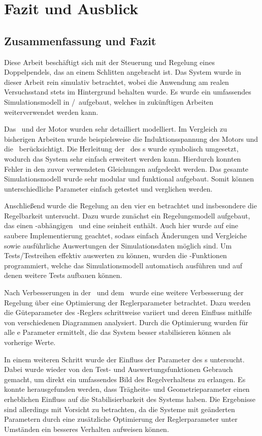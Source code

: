 \chapter{Fazit und Ausblick}

\section{Zusammenfassung und Fazit}

Diese Arbeit beschäftigt sich mit der Steuerung und Regelung eines Doppelpendels, das an einem Schlitten angebracht ist.
Das System wurde in dieser Arbeit rein simulativ betrachtet, wobei die Anwendung am realen Versuchsstand stets im Hintergrund behalten wurde.
Es wurde ein umfassendes Simulationsmodell in \ml/\sm\ aufgebaut, welches in zukünftigen Arbeiten weiterverwendet werden kann.

Das \spds\ und der Motor wurden sehr detailliert modelliert.
Im Vergleich zu bisherigen Arbeiten wurde beispielsweise die Induktionsspannung des Motors und die \crb\ berücksichtigt.
Die Herleitung der \bwgl\ des \spds s wurde symbolisch umgesetzt, wodurch das System sehr einfach erweitert werden kann.
Hierdurch konnten Fehler in den zuvor verwendeten Gleichungen aufgedeckt werden.
Das gesamte Simulationsmodell wurde sehr modular und funktional aufgebaut.
Somit können unterschiedliche Parameter einfach getestet und verglichen werden.

Anschließend wurde die Regelung an den vier \ap en betrachtet und insbesondere die Regelbarkeit untersucht.
Dazu wurde zunächst ein Regelungsmodell aufgebaut, das einen \ap-abhängigen \zsr\ und eine \vorst seinheit enthält.
Auch hier wurde auf eine saubere Implementierung geachtet, sodass einfach Änderungen und Vergleiche sowie ausführliche Auswertungen der Simulationsdaten möglich sind.
Um Tests/Testreihen effektiv auswerten zu können, wurden die \xots-Funktionen programmiert, welche das Simulationsmodell automatisch ausführen und auf denen weitere Tests aufbauen können.

Nach Verbesserungen in der \vorst\ und dem \beob\ wurde eine weitere Verbesserung der Regelung über eine Optimierung der Reglerparameter betrachtet.
Dazu werden die Güteparameter des \ricc-Reglers schrittweise variiert und deren Einfluss mithilfe von verschiedenen Diagrammen analysiert.
Durch die Optimierung wurden für alle \ap e Parameter ermittelt, die das System besser stabilisieren können als vorherige Werte.

In einem weiteren Schritt wurde der Einfluss der Parameter des \dpd s untersucht.
Dabei wurde wieder von den Test- und Auswertungsfunktionen Gebrauch gemacht, um direkt ein umfassendes Bild des Regelverhaltens zu erlangen.
Es konnte herausgefunden werden, dass Trägheits- und Geometrieparameter einen erheblichen Einfluss auf die Stabilisierbarkeit des Systems haben.
Die Ergebnisse sind allerdings mit Vorsicht zu betrachten, da die Systeme mit geänderten Parametern durch eine zusätzliche Optimierung der Reglerparameter unter Umständen ein besseres Verhalten aufweisen können.

